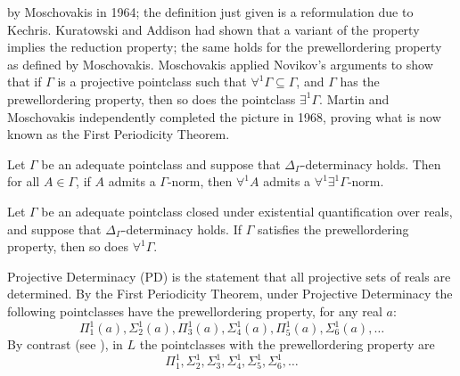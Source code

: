 \documentclass{book}%
\begin{document}
by Moschovakis in 1964; the definition just given is a reformulation due to
Kechris.
Kuratowski  and
Addison  had shown that a variant
of the property
implies the reduction property; the same holds for the prewellordering property as defined by Moschovakis.
Moschovakis applied Novikov's arguments to show that if $\Gamma$ is a projective pointclass
such that $\forall^{1}\Gamma \subseteq \Gamma$, and $\Gamma$ has
the prewellordering property, then so does the pointclass
$\exists^{1}\Gamma$. Martin and Moschovakis
independently completed the picture in 1968, proving what is now known as
the First Periodicity Theorem.



\begin{theorem}
Let $\Gamma$ be an adequate pointclass and suppose that
$\Delta_{\Gamma}$-determinacy holds. Then for all $A \in \Gamma$,
if\/ $A$ admits a $\Gamma$-norm, then $\forall^{1} A$ admits a
$\forall^{1}\exists^{1}\Gamma$-norm.
\end{theorem}

\begin{corollary}
Let $\Gamma$ be an adequate pointclass closed under existential
quantification over reals, and suppose that $\Delta_{\Gamma}$-determinacy holds. If $\Gamma$ satisfies the prewellordering
property, then so does $\forall^{1}\Gamma$.
\end{corollary}

Projective Determinacy (PD) is the statement
that all projective sets of reals are determined. By the First Periodicity Theorem,
under Projective Determinacy the following pointclasses have the prewellordering
property, for any real $a$:
$$\Pi^{1}_{1}(a), \Sigma^{1}_{2}(a), \Pi^{1}_{3}(a),
\Sigma^{1}_{4}(a), \Pi^{1}_{5}(a), \Sigma^{1}_{6}(a), \ldots$$ By
contrast (see \cite[pp.~409--410]{Kanamori}), in $L$ the pointclasses with the prewellordering property
are
$$\Pi^{1}_{1}, \Sigma^{1}_{2}, \Sigma^{1}_{3},
\Sigma^{1}_{4}, \Sigma^{1}_{5}, \Sigma^{1}_{6}, \ldots$$
\end{document}
